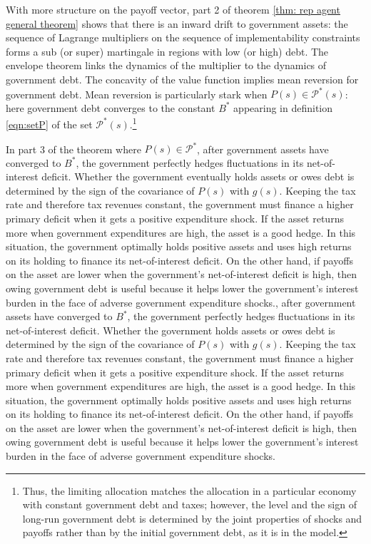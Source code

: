 \documentclass[thmsb,11pt]{article}
\begin{document}
With more structure on the payoff vector, part 2 of  theorem \ref{thm: rep agent general theorem} shows that there is an  inward drift to government assets:
the sequence of Lagrange multipliers on the sequence of implementability constraints forms a sub (or super) martingale in  regions with low (or high) debt.
The envelope theorem links the dynamics of the multiplier to the dynamics  of government debt.  The concavity of the value function implies
mean reversion for government  debt. Mean reversion is particularly stark when $P(s)\in \mathcal{P}^*(s)$: here  government debt converges to
the constant $B^*$ appearing in  definition \eqref{eqn:setP} of the set $\mathcal{P}^*(s)$.\footnote{Thus, the limiting allocation matches the allocation in
a particular \citeauthor{LucasJr.1983} economy  with constant government  debt and taxes; however,
the level and the sign of long-run government debt is determined by the joint properties of shocks and payoffs rather than
by the initial government debt,  as it is in the \citeauthor{LucasJr.1983} model.}



In part 3 of the theorem where  $P(s)\in\mathcal{P}^*$,
after government assets have converged to $B^*$, %
the government perfectly hedges fluctuations in
its net-of-interest deficit.   Whether the government eventually holds assets or owes  debt is determined
by the sign of the covariance of $P(s)$ with $g(s)$.
Keeping the tax rate and therefore tax revenues constant, the government must finance
a higher primary deficit when it gets a positive expenditure shock.
If the asset returns more when government expenditures are high, the asset is a good hedge. In this situation, the government optimally holds positive assets and uses high returns
on its holding to finance its  net-of-interest deficit. On the other hand,  if  payoffs on the asset  are lower  when the
government's net-of-interest deficit is high, then owing government debt is useful because it helps  lower the government's interest burden in the face of adverse government expenditure shocks., after government assets have converged to $B^*$, %
the government perfectly hedges fluctuations in
its net-of-interest deficit.   Whether the government holds assets or owes  debt is determined
by the sign of the covariance of $P(s)$ with $g(s)$.
Keeping the tax rate and therefore tax revenues constant, the government must finance
a higher primary deficit when it gets a positive expenditure shock.
If the asset returns more when government expenditures are high, the asset is a good hedge. In this situation, the government optimally holds positive assets and uses high returns
on its holding to finance its  net-of-interest deficit. On the other hand,  if  payoffs on the asset  are lower  when the
government's net-of-interest deficit is high, then owing government debt is useful because it helps  lower the government's interest burden in the face of adverse government expenditure shocks.
\end{document}
